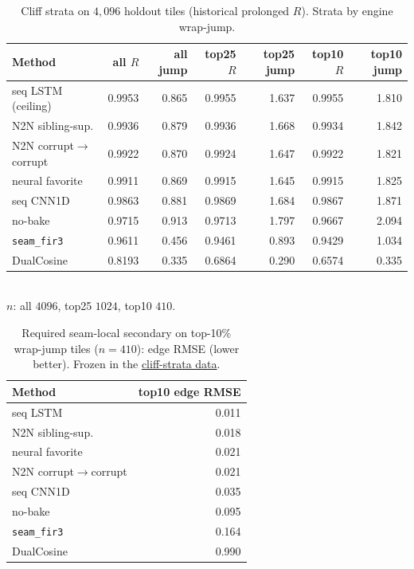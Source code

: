 \begin{table}[t]
  \centering
  \caption{Cliff strata on $4{,}096$ holdout tiles (historical prolonged $R$). Strata by engine wrap-jump.}
  \label{tab:cliff-strata}
  \setlength{\tabcolsep}{2.5pt}
  \begin{tabular}{@{}lrrrrrr@{}}
    \toprule
    Method & all $R$ & all jump & top25 $R$ & top25 jump & top10 $R$ & top10 jump \\
    \midrule
    seq LSTM (ceiling) & 0.9953 & 0.865 & 0.9955 & 1.637 & 0.9955 & 1.810 \\
    N2N sibling-sup. & 0.9936 & 0.879 & 0.9936 & 1.668 & 0.9934 & 1.842 \\
    N2N corrupt$\to$corrupt & 0.9922 & 0.870 & 0.9924 & 1.647 & 0.9922 & 1.821 \\
    neural favorite & 0.9911 & 0.869 & 0.9915 & 1.645 & 0.9915 & 1.825 \\
    seq CNN1D & 0.9863 & 0.881 & 0.9869 & 1.684 & 0.9867 & 1.871 \\
    no-bake & 0.9715 & 0.913 & 0.9713 & 1.797 & 0.9667 & 2.094 \\
    \texttt{seam\_fir3} & 0.9611 & 0.456 & 0.9461 & 0.893 & 0.9429 & 1.034 \\
    DualCosine & 0.8193 & 0.335 & 0.6864 & 0.290 & 0.6574 & 0.335 \\
    \bottomrule
  \end{tabular}\\[0.3em]
  {\footnotesize $n$: all $4096$, top25 $1024$, top10 $410$.}
\end{table}

\begin{table}[t]
  \centering
  \caption{Required seam-local secondary on top-10\% wrap-jump tiles ($n{=}410$): edge RMSE (lower better). Frozen in the \href{https://github.com/reeldemo/denoise-opt-meta/blob/master/paper/Unsupervised_Wavetable_Seam_Artifact_Repair_via_Hybrid_GA-PPO_Meta-Search_v10/figures/cliff_strata.json}{cliff-strata data}.}
  \label{tab:cliff-edge-rmse}
  \setlength{\tabcolsep}{3pt}
  \begin{tabular}{@{}lr@{}}
    \toprule
    Method & top10 edge RMSE \\
    \midrule
    seq LSTM & 0.011 \\
    N2N sibling-sup. & 0.018 \\
    neural favorite & 0.021 \\
    N2N corrupt$\to$corrupt & 0.021 \\
    seq CNN1D & 0.035 \\
    no-bake & 0.095 \\
    \texttt{seam\_fir3} & 0.164 \\
    DualCosine & 0.990 \\
    \bottomrule
  \end{tabular}
\end{table}

